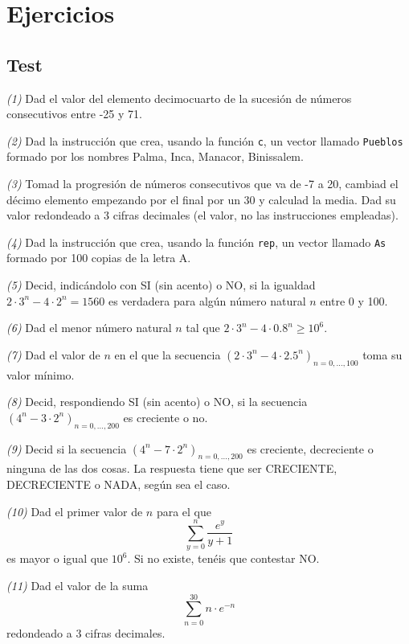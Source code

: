 \documentclass[]{book}
\theoremstyle{definition}
\theoremstyle{definition}
\theoremstyle{definition}
\theoremstyle{remark}
\begin{document}
\hypertarget{ejercicios-2}{%
\section{Ejercicios}\label{ejercicios-2}}

\hypertarget{test-1}{%
\subsection*{Test}\label{test-1}}

\emph{(1)} Dad el valor del elemento decimocuarto de la sucesión de números consecutivos entre -25 y 71.

\emph{(2)} Dad la instrucción que crea, usando la función \texttt{c}, un vector llamado \texttt{Pueblos} formado por los nombres Palma, Inca, Manacor, Binissalem.

\emph{(3)} Tomad la progresión de números consecutivos que va de -7 a 20, cambiad el décimo elemento empezando por el final por un 30 y calculad la media. Dad su valor redondeado a 3 cifras decimales (el valor, no las instrucciones empleadas).

\emph{(4)} Dad la instrucción que crea, usando la función \texttt{rep}, un vector llamado \texttt{As} formado por 100 copias de la letra A.

\emph{(5)} Decid, indicándolo con SI (sin acento) o NO, si la igualdad \(2\cdot 3^n-4\cdot 2^n=1560\) es verdadera para algún número natural \(n\) entre 0 y 100.

\emph{(6)} Dad el menor número natural \(n\) tal que \(2\cdot 3^n-4\cdot 0.8^n\geqslant 10^6\).

\emph{(7)} Dad el valor de \(n\) en el que la secuencia \((2\cdot 3^n-4\cdot 2.5^n)_{n=0,\ldots,100}\) toma su valor mínimo.

\emph{(8)} Decid, respondiendo SI (sin acento) o NO, si la secuencia \((4^n-3\cdot 2^n)_{n=0,\ldots,200}\) es creciente o no.

\emph{(9)} Decid si la secuencia \((4^n-7\cdot 2^n)_{n=0,\ldots,200}\) es creciente, decreciente o ninguna de las dos cosas. La respuesta tiene que ser CRECIENTE, DECRECIENTE o NADA, según sea el caso.

\emph{(10)} Dad el primer valor de \(n\) para el que
\[
\sum_{y=0}^n \frac{e^y}{y+1}
\]
es mayor o igual que \(10^6\). Si no existe, tenéis que contestar NO.

\emph{(11)} Dad el valor de la suma
\[
\sum_{n=0}^{30} n\cdot e^{-n}
\]
redondeado a 3 cifras decimales.
\end{document}
